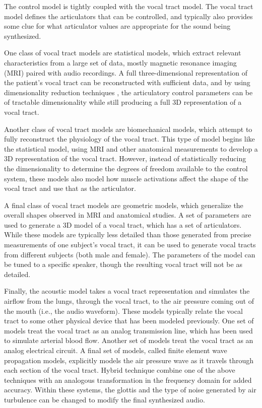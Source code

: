 \documentclass{article}
\begin{document}
The control model is tightly coupled
with the vocal tract model.
The vocal tract model defines
the articulators that can be controlled,
and typically also provides some clue
for what articulator values
are appropriate for the
sound being synthesized.

One class of vocal tract models
are statistical models,
which extract relevant characteristics
from a large set of data,
mostly magnetic resonance imaging (MRI)
paired with audio recordings.
A full three-dimensional representation
of the patient's vocal tract
can be reconstructed with sufficient data,
and by using dimensionality reduction techniques
\citep[e.g.,]{badin2002},
the articulatory control parameters
can be of tractable dimensionality
while still producing a full
3D representation of a vocal tract.

Another class of vocal tract models
are biomechanical models,
which attempt to fully reconstruct
the physiology of the vocal tract.
This type of model begins
like the statistical model,
using MRI and other anatomical measurements
to develop a 3D representation
of the vocal tract.
However, instead of statistically
reducing the dimensionality
to determine the degrees of freedom
available to the control system,
these models also model how
muscle activations affect the shape
of the vocal tract
and use that as the articulator.

A final class of vocal tract models
are geometric models,
which generalize the overall
shapes observed in
MRI and anatomical studies.
A set of parameters
are used to generate a 3D model
of a vocal tract,
which has a set of articulators.
While these models are typically
less detailed than those
generated from precise
measurements of one subject's vocal tract,
it can be used to generate vocal tracts
from different subjects
(both male and female).
The parameters of the model
can be tuned to a specific speaker,
though the resulting vocal tract
will not be as detailed.

Finally, the acoustic model takes
a vocal tract representation
and simulates the airflow from
the lungs, through the vocal tract,
to the air pressure coming out
of the mouth (i.e., the audio waveform).
These models typically relate
the vocal tract to some other physical
device that has been modeled previously.
One set of models treat the vocal tract
as an analog transmission line,
which has been used to
simulate arterial blood flow.
Another set of models treat the vocal tract
as an analog electrical circuit.
A final set of models,
called finite element wave propagation models,
explicitly models the air pressure wave
as it travels through each section
of the vocal tract.
Hybrid technique combine one
of the above techniques
with an analogous transformation
in the frequency domain for added accuracy.
Within these systems, the glottis
and the type of noise generated
by air turbulence can be changed
to modify the final synthesized audio.
\end{document}
